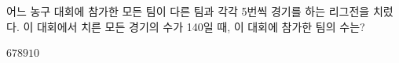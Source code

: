 \hspace*{2mm}\begin{minipage}[t]{\dimexpr\linewidth-2mm\relax}\vspace{0pt}
어느 농구 대회에 참가한 모든 팀이 다른 팀과 각각 5번씩 경기를 하는 리그전을 치렀다. 이 대회에서 치른 모든 경기의 수가 140일 때, 이 대회에 참가한 팀의 수는?
\begin{choices32}{$6$}{$7$}{$8$}{$9$}{$10$}\end{choices32}\end{minipage}
